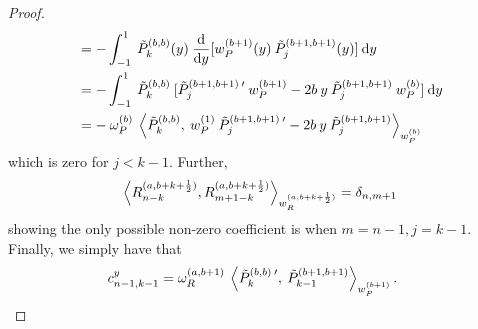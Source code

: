 \documentclass[11pt, oneside]{article}   	%
\newcommand{\half}{\frac{1}{2}}
\newcommand{\ddy}{\frac{\mathrm{d}}{\mathrm{d}y}}
\newcommand{\jac}{{\tilde P}}
\newcommand{\genjac}{R}
\newcommand{\genjacnmk}{\genjac_{n-k}}
\newcommand{\genjacw}{w_\genjac}
\newcommand{\jacw}{w_P}
\newcommand{\normgenjac}{\omega_\genjac}
\newcommand{\normjac}{\omega_P}
\begin{document}
\begin{proof}
\begin{align*}
	&= - \int_{-1}^1 \: \jac_k^{(b,b)}(y) \: \ddy [\jacw^{(b+1)}(y) \: \jac_{j}^{(b+1,b+1)}(y)] \: \D y \\
	&= - \int_{-1}^1 \: \jac_k^{(b,b)} \: [ \jac_{j}^{(b+1,b+1) \: \prime} \: \jacw^{(b+1)} - 2 b \: y \: \jac_{j}^{(b+1,b+1)} \:\jacw^{(b)} ] \: \D y \\
	&= - \: \normjac^{(b)} \: \ip< \jac_k^{(b,b)}, \: \jacw^{(1)} \: \jac_{j}^{(b+1,b+1) \: \prime} -2b \:y \: \jac_{j}^{(b+1,b+1)} >_{\jacw^{(b)}}
\end{align*}
which is zero for $j < k-1$. Further,
\begin{align*}
	\ip< \genjacnmk^{(a,b+k+\half)}, \genjac_{m+1-k}^{(a,b+k+\half)} >_{\genjacw^{(a,b+k+\half)}} = \delta_{n,m+1}
\end{align*}
showing the only possible non-zero coefficient is when $m=n-1, j=k-1$. Finally, we simply have that 
\begin{align*}
	c_{n-1,k-1}^y &= \normgenjac^{(a, b+1)} \: \ip< \jac_k^{(b,b) \: \prime}, \: \jac_{k-1}^{(b+1,b+1)} >_{\jacw^{(b+1)}}.
\end{align*}


\end{proof}
\end{document}
